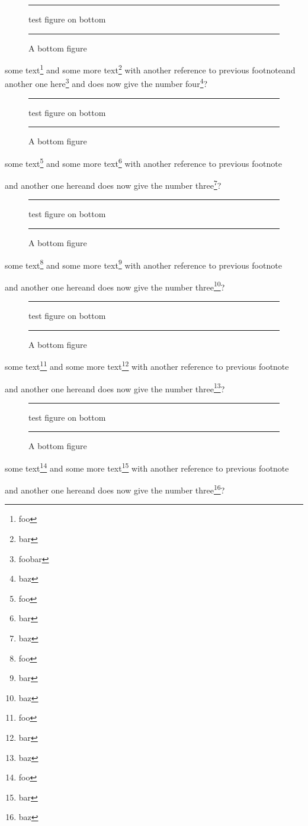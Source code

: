 \documentclass{report}
\newcommand\Afigure{\begin{figure}[b]
\hrule
test figure on bottom
\hrule
\caption{A bottom figure}
\end{figure}}
\begin{document}
\Afigure

\setcounter{footnote}{10}

some text\footnote{foo} and some more text\footnote{bar} with another
reference to previous
footnote\footnotemark[\value{footnote}]
and another one here\footnote{foobar}
and does now give the number four\footnote{baz}?


\pagebreak




\Afigure

some text\footnote{foo} and some more text\footnote{bar} with another
reference to previous
footnote\addtocounter{footnote}{-1}\footnotemark{}
and another one here
and does now give the number three\footnote{baz}?


\pagebreak


\Afigure

some text\footnote{foo} and some more text\footnote{bar} with another
reference to previous
footnote\addtocounter{footnote}{-1}\footnotemark{}
and another one here
and does now give the number three\footnote{baz}?


\pagebreak


\Afigure

some text\footnote{foo} and some more text\footnote{bar} with another
reference to previous
footnote\addtocounter{footnote}{-1}\footnotemark{}
and another one here
and does now give the number three\footnote{baz}?


\pagebreak

 

\Afigure

some text\footnote{foo} and some more text\footnote{bar} with another
reference to previous
footnote\addtocounter{footnote}{-1}\footnotemark{}
and another one here
and does now give the number three\footnote{baz}?

\clearpage

\end{document}
